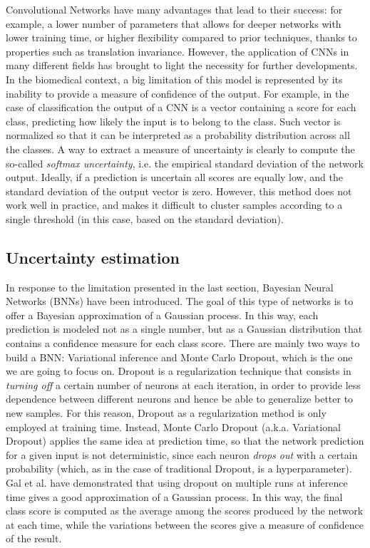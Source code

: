 \documentclass[11pt,twoside,a4paper]{article}
\begin{document}
Convolutional Networks have many advantages that lead to their success: for example, a lower number of parameters that allows for deeper networks with lower training time, or higher flexibility compared to prior techniques, thanks to properties such as translation invariance. However, the application of CNNs in many different fields has brought to light the necessity for further developments.\newline
In the biomedical context, a big limitation of this model is represented by its inability to provide a measure of confidence of the output.
For example, in the case of classification the output of a CNN is a vector containing a score for each class, predicting how likely the input is to belong to the class. Such vector is normalized so that it can be interpreted as a probability distribution across all the classes.\newline
A way to extract a measure of uncertainty is clearly to compute the so-called \textit{softmax uncertainty}, i.e. the empirical standard deviation of the network output. Ideally, if a prediction is uncertain all scores are equally low, and the standard deviation of the output vector is zero. However, this method does not work well in practice, and makes it difficult to cluster samples according to a single threshold (in this case, based on the standard deviation).

\subsection{Uncertainty estimation}
\label{sec:uncertainty}
In response to the limitation presented in the last section, Bayesian Neural Networks (BNNs) have been introduced. The goal of this type of networks is to offer a Bayesian approximation of a Gaussian process. In this way, each prediction is modeled not as a single number, but as a Gaussian distribution that contains a confidence measure for each class score. There are mainly two ways to build a BNN: Variational inference and Monte Carlo Dropout, which is the one we are going to focus on.\newline
Dropout is a regularization technique \cite{srivastava2014dropout} that consists in \textit{turning off} a certain number of neurons at each iteration, in order to provide less dependence between different neurons and hence be able to generalize better to new samples. For this reason, Dropout as a regularization method is only employed at training time. Instead, Monte Carlo Dropout (a.k.a. Variational Dropout) applies the same idea at prediction time, so that the network prediction for a given input is not deterministic, since each neuron \textit{drops out} with a certain probability (which, as in the case of traditional Dropout, is a hyperparameter).\newline
Gal et al. \cite{gal2016dropout} have demonstrated that using dropout on multiple runs at inference time gives a good approximation of a Gaussian process. In this way, the final class score is computed as the average among the scores produced by the network at each time, while the variations between the scores give a measure of confidence of the result.
\end{document}

